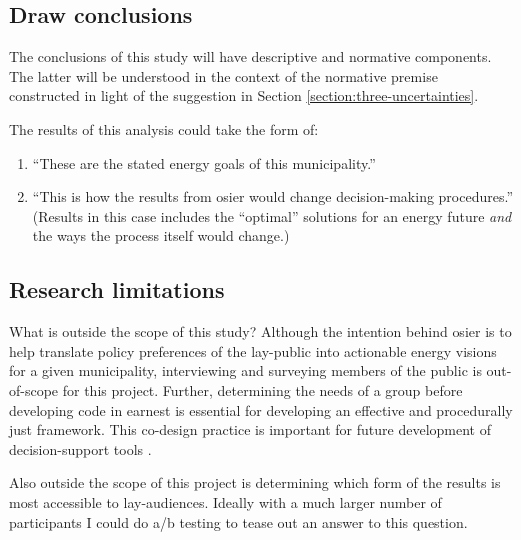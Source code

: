 \subsection{Draw conclusions}

The conclusions of this study will have descriptive and normative components.
The latter will be understood in the context of the normative premise
constructed in light of the suggestion in Section
\ref{section:three-uncertainties}.

The results of this analysis could take the form of:
    \begin{enumerate}
        \item ``These are the stated energy goals of this municipality.''
        \item ``This is how the results from \ac{osier} would change
        decision-making procedures.'' (Results in this case includes the
        ``optimal'' solutions for an energy future \textit{and} the ways the
        process itself would change.)
    \end{enumerate}

\subsection{Research limitations}

What is outside the scope of this study? Although the intention behind
\ac{osier} is to help translate policy preferences of the lay-public into
actionable energy visions for a given municipality, interviewing and surveying
members of the public is out-of-scope for this project. Further, determining the
needs of a group before developing code in earnest is essential for developing
an effective and procedurally just framework. This co-design practice is
important for future development of decision-support tools
\cite{gonzalez_developing_2022,ryder_developing_2018}.

Also outside the scope of this project is determining which form of the results
is most accessible to lay-audiences. Ideally with a much larger number of
participants I could do a/b testing to tease out an answer to this question.
